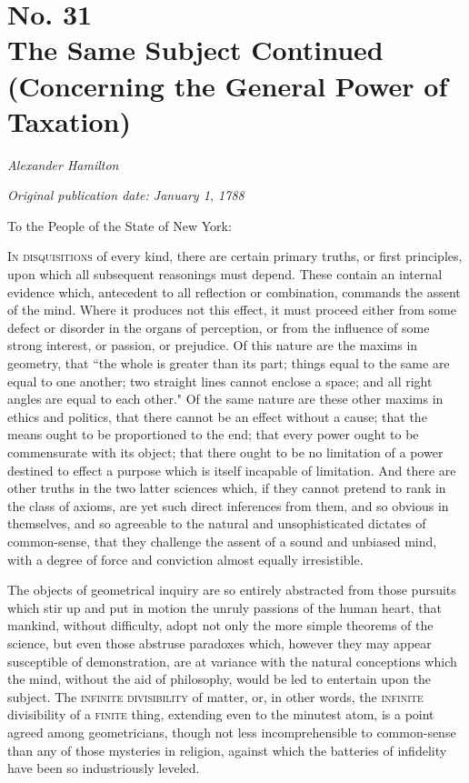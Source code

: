 \chapter[No. 31: The Same Subject Continued (Concerning the General Power of Taxation)]{No. 31\\ {\small The Same Subject Continued (Concerning the General Power of Taxation)}}

\textit{Alexander Hamilton}

\textit{Original publication date: January 1, 1788}
\vspace{1cm}

To the People of the State of New York:
\vspace{.4cm}

\textsc{In disquisitions} of every kind, there are certain primary truths, or first principles, upon which all subsequent reasonings must depend. 
These contain an internal evidence which, antecedent to all reflection or combination, commands the assent of the mind. 
Where it produces not this effect, it must proceed either from some defect or disorder in the organs of perception, or from the influence of some strong interest, or passion, or prejudice. 
Of this nature are the maxims in geometry, that ``the whole is greater than its part; things equal to the same are equal to one another; two straight lines cannot enclose a space; and all right angles are equal to each other." Of the same nature are these other maxims in ethics and politics, that there cannot be an effect without a cause; that the means ought to be proportioned to the end; that every power ought to be commensurate with its object; that there ought to be no limitation of a power destined to effect a purpose which is itself incapable of limitation. 
And there are other truths in the two latter sciences which, if they cannot pretend to rank in the class of axioms, are yet such direct inferences from them, and so obvious in themselves, and so agreeable to the natural and unsophisticated dictates of common-sense, that they challenge the assent of a sound and unbiased mind, with a degree of force and conviction almost equally irresistible.

The objects of geometrical inquiry are so entirely abstracted from those pursuits which stir up and put in motion the unruly passions of the human heart, that mankind, without difficulty, adopt not only the more simple theorems of the science, but even those abstruse paradoxes which, however they may appear susceptible of demonstration, are at variance with the natural conceptions which the mind, without the aid of philosophy, would be led to entertain upon the subject. 
The \textsc{infinite divisibility} of matter, or, in other words, the \textsc{infinite} divisibility of a \textsc{finite} thing, extending even to the minutest atom, is a point agreed among geometricians, though not less incomprehensible to common-sense than any of those mysteries in religion, against which the batteries of infidelity have been so industriously leveled.


